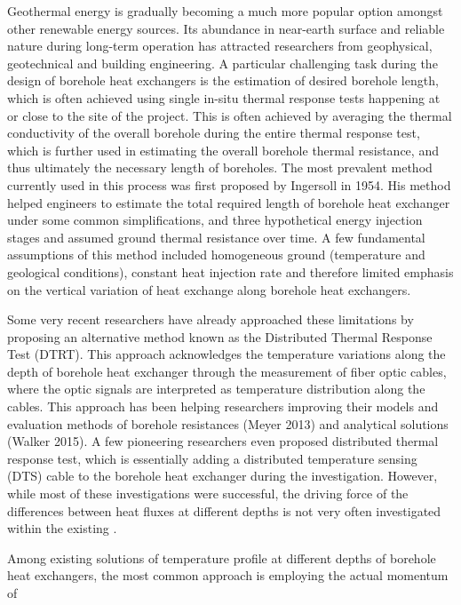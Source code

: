 Geothermal energy is gradually becoming a much more popular option amongst other renewable energy sources. Its abundance in near-earth surface and reliable nature during long-term operation has attracted researchers from geophysical, geotechnical and building engineering. A particular challenging task during the design of borehole heat exchangers is the estimation of desired borehole length, which is often achieved using single in-situ thermal response tests happening at or close to the site of the project. This is often achieved by averaging the thermal conductivity of the overall borehole during the entire thermal response test, which is further used in estimating the overall borehole thermal resistance, and thus ultimately the necessary length of boreholes. The most prevalent method currently used in this process was first proposed by Ingersoll in 1954. His method helped engineers to estimate the total required length of borehole heat exchanger under some common simplifications, and three hypothetical energy injection stages and assumed ground thermal resistance over time. A few fundamental assumptions of this method included homogeneous ground (temperature and geological conditions), constant heat injection rate and therefore limited emphasis on the vertical variation of heat exchange along borehole heat exchangers. 

Some very recent researchers have already approached these limitations by proposing an alternative method known as the Distributed Thermal Response Test (DTRT). This approach acknowledges the temperature variations along the depth of borehole heat exchanger through the measurement of fiber optic cables, where the optic signals are interpreted as temperature distribution along the cables. This approach has been helping researchers improving their models and evaluation methods of borehole resistances (Meyer 2013) and analytical solutions (Walker 2015). A few pioneering researchers even proposed distributed thermal response test, which is essentially adding a distributed temperature sensing (DTS) cable to the borehole heat exchanger during the investigation. However, while most of these investigations were successful, the driving force of the differences between heat fluxes at different depths is not very often investigated within the existing . 

Among existing solutions of temperature profile at different depths of borehole heat exchangers, the most common approach is employing the actual momentum of 

